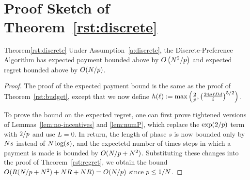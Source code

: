 \section{Proof Sketch of Theorem~\ref{rst:discrete}}
\label{sec:discussion-proof1}

\begin{rtheorem}{Theorem}{\ref{rst:discrete}}
Under Assumption~\ref{a:discrete}, the Discrete-Preference Algorithm
has expected payment bounded above by 
$O \left(N^2/p \right)$
and expected regret bounded above by $O(N / p)$.
\end{rtheorem}

\begin{proof}
The proof of the expected payment bound is the same as the proof of
Theorem~\ref{rst:budget},
except that we now define
$h(\ell) := \max \left( \frac{2}{p},
\left( \frac{24 \sigma \ell D d}{\hat{z}} \right)^{5/2} \right)$.

To prove the bound on the expected regret,
one can first prove tightened versions of Lemmas~\ref{lem:no-incentives} and \ref{lem:numP},
which replace the $\exp(2/p)$ term with $2/p$ and use $L=0$.
In return, the length of phase $s$ is now bounded only by $N s$
instead of $N \log(s)$,
and the expectetd number of times steps in which a payment is made is bounded by
$O(N/p + N^2)$.
Substituting these changes into the proof of Theorem~\ref{rst:regret},
we obtain the bound $O(R(N/p + N^2) + N R +
N R) = O(N/p)$ since $p \le 1/N$.
\end{proof}



